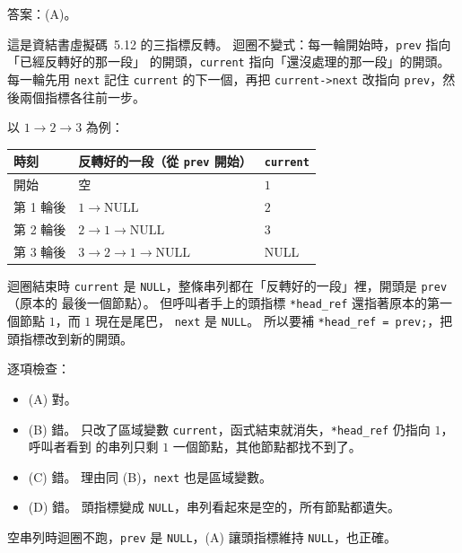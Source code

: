 \begin{pastsoln}
答案：(A)。

這是資結書虛擬碼~5.12 的三指標反轉。 迴圈不變式：每一輪開始時，\texttt{prev} 指向「已經反轉好的那一段」
的開頭，\texttt{current} 指向「還沒處理的那一段」的開頭。 每一輪先用 \texttt{next} 記住
\texttt{current} 的下一個，再把 \texttt{current->next} 改指向 \texttt{prev}，然後兩個指標各往前一步。

以 $1 \to 2 \to 3$ 為例：
\begin{center}
\small
\begin{tabular}{lll}
\toprule
時刻 & 反轉好的一段（從 \texttt{prev} 開始） & \texttt{current} \\
\midrule
開始 & 空 & $1$ \\
第 1 輪後 & $1 \to \text{NULL}$ & $2$ \\
第 2 輪後 & $2 \to 1 \to \text{NULL}$ & $3$ \\
第 3 輪後 & $3 \to 2 \to 1 \to \text{NULL}$ & NULL \\
\bottomrule
\end{tabular}
\end{center}
迴圈結束時 \texttt{current} 是 \texttt{NULL}，整條串列都在「反轉好的一段」裡，開頭是 \texttt{prev}（原本的
最後一個節點）。 但呼叫者手上的頭指標 \texttt{*head\_ref} 還指著原本的第一個節點 $1$，而 $1$ 現在是尾巴，
\texttt{next} 是 \texttt{NULL}。 所以要補 \texttt{*head\_ref = prev;}，把頭指標改到新的開頭。

逐項檢查：
\begin{itemize}
\item (A) 對。
\item (B) 錯。 只改了區域變數 \texttt{current}，函式結束就消失，\texttt{*head\_ref} 仍指向 $1$，呼叫者看到
的串列只剩 $1$ 一個節點，其他節點都找不到了。
\item (C) 錯。 理由同 (B)，\texttt{next} 也是區域變數。
\item (D) 錯。 頭指標變成 \texttt{NULL}，串列看起來是空的，所有節點都遺失。
\end{itemize}
空串列時迴圈不跑，\texttt{prev} 是 \texttt{NULL}，(A) 讓頭指標維持 \texttt{NULL}，也正確。
\end{pastsoln}
